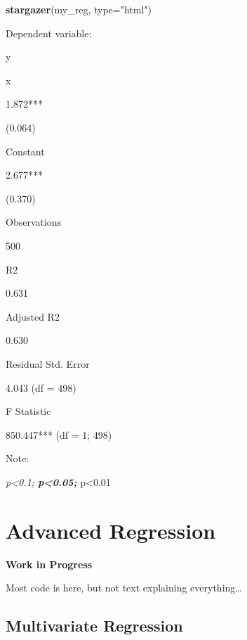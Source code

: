 \documentclass[]{book}
\newenvironment{Shaded}{\begin{snugshade}}{\end{snugshade}}
\newcommand{\KeywordTok}[1]{\textcolor[rgb]{0.13,0.29,0.53}{\textbf{#1}}}
\newcommand{\DataTypeTok}[1]{\textcolor[rgb]{0.13,0.29,0.53}{#1}}
\newcommand{\StringTok}[1]{\textcolor[rgb]{0.31,0.60,0.02}{#1}}
\newcommand{\NormalTok}[1]{#1}
\theoremstyle{definition}
\theoremstyle{definition}
\theoremstyle{definition}
\theoremstyle{remark}
\begin{document}
\begin{Shaded}
\begin{Highlighting}[]
\KeywordTok{stargazer}\NormalTok{(my_reg, }\DataTypeTok{type=}\StringTok{"html"}\NormalTok{) }
\end{Highlighting}
\end{Shaded}

Dependent variable:

y

x

1.872***

(0.064)

Constant

2.677***

(0.370)

Observations

500

R2

0.631

Adjusted R2

0.630

Residual Std. Error

4.043 (df = 498)

F Statistic

850.447*** (df = 1; 498)

Note:

\emph{p\textless{}0.1; \textbf{p\textless{}0.05; }}p\textless{}0.01

\chapter{Advanced Regression}\label{advanced-regression}

\textbf{Work in Progress}

Most code is here, but not text explaining everything\ldots{}

\section{Multivariate Regression}\label{multivariate-regression}
\end{document}
